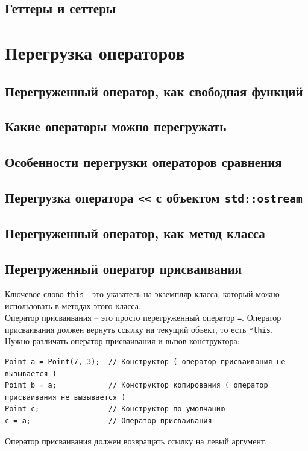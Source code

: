 \documentclass{article}
\begin{document}
\subsection*{Геттеры и сеттеры}

\newpage
\section*{Перегрузка операторов}

\subsection*{Перегруженный оператор, как свободная функций}

\subsection*{Какие операторы можно перегружать}

\subsection*{Особенности перегрузки операторов сравнения}


\subsection*{Перегрузка оператора \texttt{<{}<} с объектом \texttt{std::ostream}}

\subsection*{Перегруженный оператор, как метод класса}

\subsection*{Перегруженный оператор присваивания}
Ключевое слово \texttt{this} - это указатель на экземпляр класса, который можно использовать в методах этого класса.\\
Оператор присваивания -- это просто перегруженный оператор \texttt{=}. Оператор присваивания должен вернуть ссылку на текущий объект, то есть \texttt{*this}.\\

Нужно различать оператор присваивания и вызов конструктора:
\begin{lstlisting}
Point a = Point(7, 3);  // Конструктор ( оператор присваивания не вызывается )
Point b = a;            // Конструктор копирования ( оператор присваивания не вызывается )
Point c;                // Конструктор по умолчанию
c = a;                  // Оператор присваивания
\end{lstlisting}
Оператор присваивания должен возвращать ссылку на левый аргумент.
\end{document}
